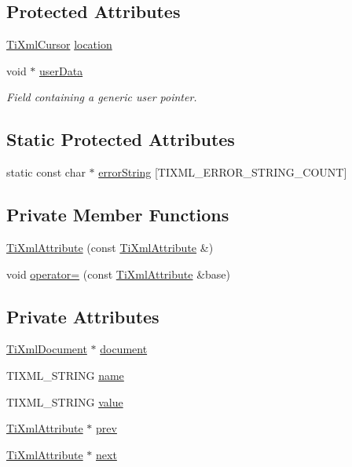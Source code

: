 \subsection*{Protected Attributes}
\begin{DoxyCompactItemize}
\item 
\hyperlink{structTiXmlCursor}{TiXmlCursor} \hyperlink{classTiXmlBase_a0d992580f3bc264909f898e942677a3c}{location}
\item 
void $\ast$ \hyperlink{classTiXmlBase_ab242c01590191f644569fa89a080d97c}{userData}
\begin{DoxyCompactList}\small\item\em Field containing a generic user pointer. \item\end{DoxyCompactList}\end{DoxyCompactItemize}
\subsection*{Static Protected Attributes}
\begin{DoxyCompactItemize}
\item 
static const char $\ast$ \hyperlink{classTiXmlBase_a7ac8feec4100e446b3d78e1ac0659700}{errorString} \mbox{[}TIXML\_\-ERROR\_\-STRING\_\-COUNT\mbox{]}
\end{DoxyCompactItemize}
\subsection*{Private Member Functions}
\begin{DoxyCompactItemize}
\item 
\hyperlink{classTiXmlAttribute_aee53e434ace7271afc5ce51aeea0b400}{TiXmlAttribute} (const \hyperlink{classTiXmlAttribute}{TiXmlAttribute} \&)
\item 
void \hyperlink{classTiXmlAttribute_a83b9c2a47dbfadf5029f2c0f13c18466}{operator=} (const \hyperlink{classTiXmlAttribute}{TiXmlAttribute} \&base)
\end{DoxyCompactItemize}
\subsection*{Private Attributes}
\begin{DoxyCompactItemize}
\item 
\hyperlink{classTiXmlDocument}{TiXmlDocument} $\ast$ \hyperlink{classTiXmlAttribute_ada41d3cff50cd33a78072806f88d4433}{document}
\item 
TIXML\_\-STRING \hyperlink{classTiXmlAttribute_afcbe165f33f08cf9b24daa33f0ee951a}{name}
\item 
TIXML\_\-STRING \hyperlink{classTiXmlAttribute_ae9e4e5f442347434b1da43954cc1b411}{value}
\item 
\hyperlink{classTiXmlAttribute}{TiXmlAttribute} $\ast$ \hyperlink{classTiXmlAttribute_aaf6c6272c625fbf38e571cbf570ea94a}{prev}
\item 
\hyperlink{classTiXmlAttribute}{TiXmlAttribute} $\ast$ \hyperlink{classTiXmlAttribute_ae851adf61b80cf45b797fee77dea135f}{next}
\end{DoxyCompactItemize}
